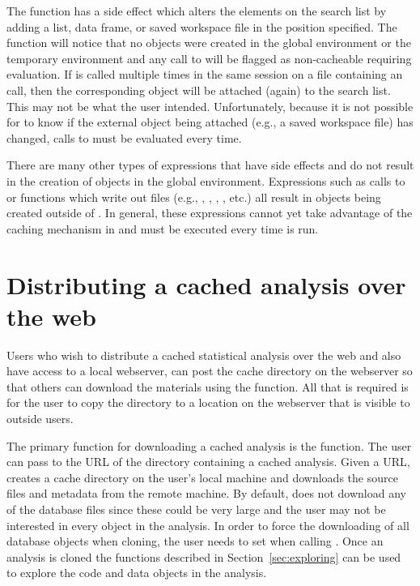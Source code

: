 \documentclass[nojss]{jss}
\begin{document}
The  function has a side effect which alters the elements
on the search list by adding a list, data frame, or saved workspace
file in the position specified.  The  function will
notice that no objects were created in the global environment or the
temporary environment and any call to  will be flagged as
non-cacheable requiring evaluation.  If  is called
multiple times in the same session on a file containing an
 call, then the corresponding object will be attached
(again) to the search list.  This may not be what the user intended.
Unfortunately, because it is not possible for  to know if
the external object being attached (e.g., a saved workspace file) has
changed, calls to  must be evaluated every time.

There are many other types of expressions that have side effects and
do not result in the creation of objects in the global environment.
Expressions such as calls to  or functions which write
out files (e.g., , , ,
, etc.) all result in objects being created outside of
.  In general, these expressions cannot yet take advantage
of the caching mechanism in  and must be executed every
time  is run.

\section{Distributing a cached analysis over the web}
\label{sec:distribution}

Users who wish to distribute a cached statistical analysis over the
web and also have access to a local webserver, can post the cache
directory on the webserver so that others can download the materials
using the  function.  All that is required is for the
user to copy the directory to a location on the webserver that is
visible to outside users.

The primary function for downloading a cached analysis is the
 function.  The user can pass to 
the URL of the directory containing a cached analysis.  Given a URL,
 creates a cache directory on the user's local
machine and downloads the source files and metadata from the remote
machine.  By default,  does not download any of the
database files since these could be very large and the user may not be
interested in every  object in the analysis.  In order to
force the downloading of all database objects when cloning, the user
needs to set  when calling .
Once an analysis is cloned the functions described in
Section~\ref{sec:exploring} can be used to explore the code and data
objects in the analysis.
\end{document}
